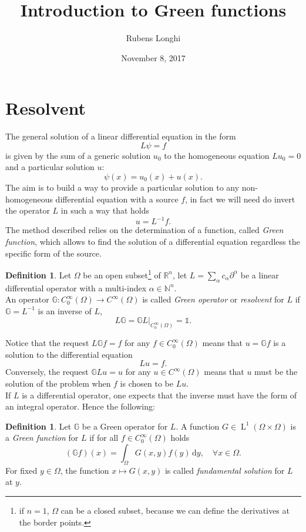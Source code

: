 \documentclass[a4paper,11pt]{article}	%
\title{Introduction to Green functions}
\author{Rubens Longhi}
\date{November 8, 2017}
\theoremstyle{classicthm}
\theoremstyle{definition}
\newtheorem{defn}[theorem]{Definition}
\theoremstyle{definition}
\def\mR{{\mathbb R}}
\newcommand{\dd}{\mathrm d}
\newcommand{\supc}[1]{C_0^\infty(#1)}
\begin{document}
\maketitle		%
\section{Resolvent}

The general solution of a linear differential equation in the form
\[	L\psi=f	\]
is given by the sum of a generic solution $u_0$ to the homogeneous equation $Lu_0=0$ and a particular solution $u$:
\[	\psi(x)=u_0(x)+u(x).	\]
The aim is to build a way to provide a particular solution to any non-homogeneous differential equation with a source $f$, in fact we will need do invert the operator $L$ in such a way that holds
\[	u=L^{-1}f.	\]
The method described relies on the determination of a function, called \emph{Green function}, which allows to find the solution of a differential equation regardless the specific form of the source.

\begin{defn}
	Let $\Omega$ be an open subset\footnote{if $n=1$, $\Omega$ can be a closed subset, because we can define the derivatives at the border points.} of $\mR^n$, let $ L=\sum_{\alpha}c_\alpha\partial^\alpha$ be a linear differential operator with a multi-index $\alpha\in\mathbb{N}^n$.\\ An operator $\mathds{G}:C_0^\infty(\Omega)\to C^\infty(\Omega)$ is called \emph{Green operator} or \emph{resolvent} for $L$ if $\mathds{G}=L^{-1}$ is an inverse of $L$,
	\[	L\mathds{G}=\mathds{G}L|_ {\supc{\Omega}}=\mathds{1}.		\]
\end{defn}

\noindent Notice that the request $L\mathds{G}f=f$ for any $f\in\supc{\Omega}$ means that $u=\mathds{G}f$ is a solution to the differential equation
\[	Lu=f.	\]
Conversely, the request $\mathds{G}Lu=u$ for any $u\in C^\infty(\Omega)$ means that $u$ must be the solution of the problem when $f$ is chosen to be $Lu$.\\

\noindent If $L$ is a differential operator, one expects that the inverse must have the form of an integral operator. Hence the following:

\begin{defn}
	Let $\mathds{G}$ be a Green operator for $L$. A function $G\in\operatorname{L}^1(\Omega\times\Omega)$ is a \emph{Green function} for $L$ if for all $f\in \supc{\Omega}$ holds
	\[	(\mathds{G}f)(x)=\int_\Omega G(x,y)f(y)\,\dd y, \quad\forall x\in\Omega. 	\]
	For fixed $y\in\Omega$, the function $x\mapsto G(x,y)$ is called \emph{fundamental solution} for $L$ at $y$.
\end{defn}
\end{document}
